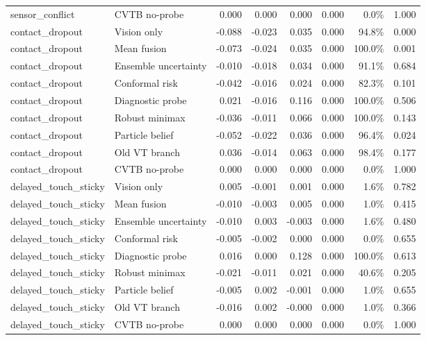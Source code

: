 \begin{table}[t]
\begin{tabular}{llrrrrrr}
sensor\_conflict & CVTB no-probe & 0.000 & 0.000 & 0.000 & 0.000 & 0.0\% & 1.000 \\
contact\_dropout & Vision only & -0.088 & -0.023 & 0.035 & 0.000 & 94.8\% & 0.000 \\
contact\_dropout & Mean fusion & -0.073 & -0.024 & 0.035 & 0.000 & 100.0\% & 0.001 \\
contact\_dropout & Ensemble uncertainty & -0.010 & -0.018 & 0.034 & 0.000 & 91.1\% & 0.684 \\
contact\_dropout & Conformal risk & -0.042 & -0.016 & 0.024 & 0.000 & 82.3\% & 0.101 \\
contact\_dropout & Diagnostic probe & 0.021 & -0.016 & 0.116 & 0.000 & 100.0\% & 0.506 \\
contact\_dropout & Robust minimax & -0.036 & -0.011 & 0.066 & 0.000 & 100.0\% & 0.143 \\
contact\_dropout & Particle belief & -0.052 & -0.022 & 0.036 & 0.000 & 96.4\% & 0.024 \\
contact\_dropout & Old VT branch & 0.036 & -0.014 & 0.063 & 0.000 & 98.4\% & 0.177 \\
contact\_dropout & CVTB no-probe & 0.000 & 0.000 & 0.000 & 0.000 & 0.0\% & 1.000 \\
delayed\_touch\_sticky & Vision only & 0.005 & -0.001 & 0.001 & 0.000 & 1.6\% & 0.782 \\
delayed\_touch\_sticky & Mean fusion & -0.010 & -0.003 & 0.005 & 0.000 & 1.0\% & 0.415 \\
delayed\_touch\_sticky & Ensemble uncertainty & -0.010 & 0.003 & -0.003 & 0.000 & 1.6\% & 0.480 \\
delayed\_touch\_sticky & Conformal risk & -0.005 & -0.002 & 0.000 & 0.000 & 0.0\% & 0.655 \\
delayed\_touch\_sticky & Diagnostic probe & 0.016 & 0.000 & 0.128 & 0.000 & 100.0\% & 0.613 \\
delayed\_touch\_sticky & Robust minimax & -0.021 & -0.011 & 0.021 & 0.000 & 40.6\% & 0.205 \\
delayed\_touch\_sticky & Particle belief & -0.005 & 0.002 & -0.001 & 0.000 & 1.0\% & 0.655 \\
delayed\_touch\_sticky & Old VT branch & -0.016 & 0.002 & -0.000 & 0.000 & 1.0\% & 0.366 \\
delayed\_touch\_sticky & CVTB no-probe & 0.000 & 0.000 & 0.000 & 0.000 & 0.0\% & 1.000 \\
\bottomrule
\end{tabular}
\end{table}

